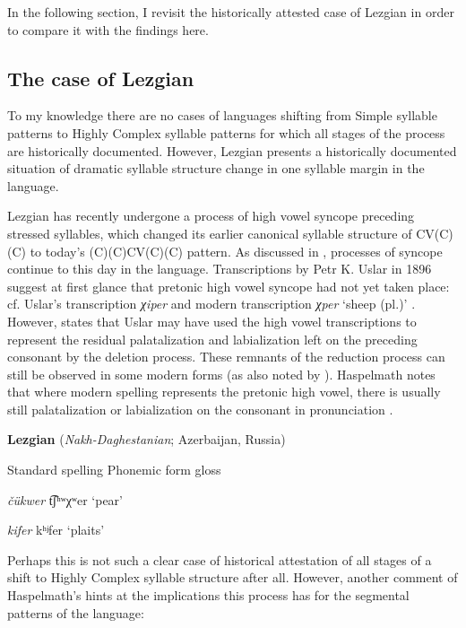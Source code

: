   In the following section, I revisit the historically attested case of Lezgian in order to compare it with the findings here.

\subsection{The case of Lezgian}\label{sec:8.4.4}

  To my knowledge there are no cases of languages shifting from Simple syllable patterns to Highly Complex syllable patterns for which all stages of the process are historically documented. However, Lezgian presents a historically documented situation of dramatic syllable structure change in one syllable margin in the language.

  Lezgian has recently undergone a process of high vowel syncope preceding stressed syllables, which changed its earlier canonical syllable structure of CV(C)(C) to today’s (C)(C)CV(C)(C) pattern. As discussed in , processes of syncope continue to this day in the language. Transcriptions by Petr K. Uslar in 1896 suggest at first glance that pretonic high vowel syncope had not yet taken place: cf. Uslar’s transcription \textit{χiper} and modern transcription \textit{χper} ‘sheep (pl.)’ \citep[36]{Haspelmath1993}. However, \citet[56]{Haspelmath1993} states that Uslar may have used the high vowel transcriptions to represent the residual palatalization and labialization left on the preceding consonant by the deletion process. These remnants of the reduction process can still be observed in some modern forms (as also noted by \citealt{ChitoranBabaliyeva2007}). Haspelmath notes that where modern spelling represents the pretonic high vowel, there is usually still palatalization or labialization on the consonant in pronunciation .

\ea\label{ex:8.3}
  \textbf{Lezgian} (\textit{Nakh-Daghestanian}; Azerbaijan, Russia)

Standard spelling  Phonemic form  gloss

\textit{čükwer}      t͡ʃʰʷχʷer    ‘pear’

\textit{kifer}      kʰʲfer       ‘plaits’
\citep[37]{Haspelmath1993}
\z

Perhaps this is not such a clear case of historical attestation of all stages of a shift to Highly Complex syllable structure after all. However, another comment of Haspelmath’s hints at the implications this process has for the segmental patterns of the language:

